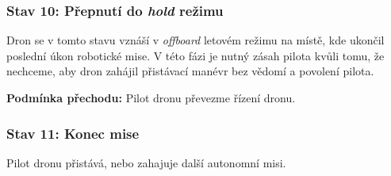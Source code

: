 \subsubsection{Stav 10: Přepnutí do \textit{hold} režimu}

Dron se v tomto stavu vznáší v \textit{offboard} letovém režimu na místě, kde ukončil poslední úkon robotické mise. V této fázi je nutný zásah pilota kvůli tomu, že nechceme, aby dron zahájil přistávací manévr bez vědomí a povolení pilota.

\noindent\textbf{Podmínka přechodu:} Pilot dronu převezme řízení dronu.

\subsubsection{Stav 11: Konec mise}

Pilot dronu přistává, nebo zahajuje další autonomní misi.

